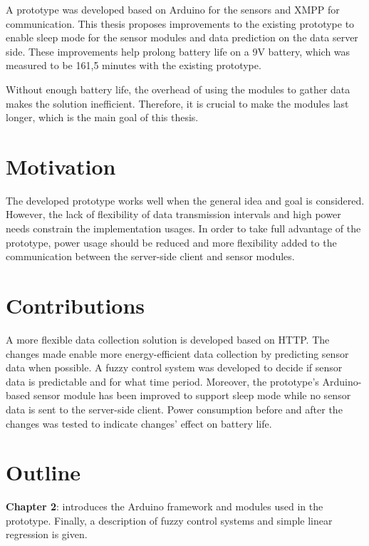A prototype was developed based on Arduino for the sensors and XMPP for communication. This thesis proposes improvements to the existing prototype to enable sleep mode for the sensor modules and data prediction on the data server side. These improvements help prolong battery life on a 9V battery, which was measured to be 161,5 minutes with the existing prototype. 

Without enough battery life, the overhead of using the modules to gather data makes the solution inefficient. Therefore, it is crucial to make the modules last longer, which is the main goal of this thesis.

\section{Motivation}
The developed prototype \cite{prev_thesis} works well when the general idea and goal is considered. However, the lack of flexibility of data transmission intervals and high power needs constrain the implementation usages. In order to take full advantage of the prototype, power usage should be reduced and more flexibility added to the communication between the server-side client and sensor modules.  

\section{Contributions}

A more flexible data collection solution is developed based on HTTP. The changes made enable more energy-efficient data collection by predicting sensor data when possible. A fuzzy control system was developed to decide if sensor data is predictable and for what time period.  Moreover, the prototype's Arduino-based sensor module has been improved to support sleep mode while no sensor data is sent to the server-side client. Power consumption before and after the changes was tested to indicate changes' effect on battery life. 

\section{Outline}


\noindent \textbf{Chapter 2}: introduces the Arduino framework and modules used in the prototype. Finally, a description of fuzzy control systems and simple linear regression is given.
\newline

